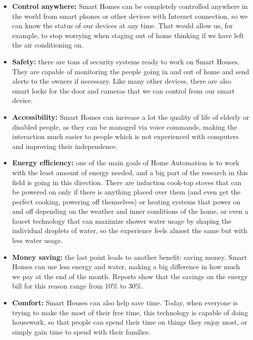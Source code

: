 \begin{itemize}
	\item \textbf{Control anywhere:} Smart Homes can be completely controlled anywhere in the world from smart phones or
	other devices with Internet connection, so we can know the status of our devices at any time. That would allow us, for
	example, to stop worrying when staging out of home thinking if we have left the air conditioning on.
	\item \textbf{Safety:} there are tons of security systems ready to work on Smart Houses. They are capable of monitoring
	the people going in and out of home and send alerts to the owners if necessary. Like many other devices, there are also
	smart locks for the door and cameras that we can control from our smart device.
	\item \textbf{Accessibility:} Smart Homes can increase a lot the quality of life of elderly or disabled people, as they can be
	managed via voice commands, making the interaction much easier to people which is not experienced with computers and
	improving their independence.
	\item \textbf{Energy efficiency:} one of the main goals of Home Automation is to work with the least amount of energy 
	needed, and a big part of the research in this field is going in this direction. There are induction cook-top stoves that can be 
	powered on only if there is anything placed over them (and even get the perfect cooking, powering off themselves)\cite{directenergyAdvantages}
	or heating systems that power on and off depending on the weather and inner conditions of the home, or even a faucet 
	technology that can maximize shower water usage by shaping the individual droplets of water, so the experience feels 
	almost the same but with less water usage. 
	\item \textbf{Money saving:} the last point leads to another benefit: saving money. Smart Homes can use less energy and 
	water, making a big difference in how much we pay at the end of the month. Reports show that the savings on the energy bill 
	for this reason range from 10\% to 30\%.\cite{directenergyAdvantages}
	\item \textbf{Comfort:} Smart Houses can also help save time. Today, when everyone is trying to make the most of their free
	time, this technology is capable of doing housework, so that people can spend their time on things they enjoy most, or simply 
	gain time  to spend with their families.
\end{itemize}

